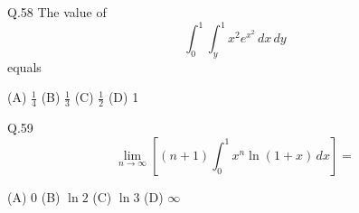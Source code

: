 \documentclass{article}
\begin{document}
																																																																																																								   \vspace{0.5cm}

																																																																																																								   Q.58 \quad  The value of 
																																																																																																								   \[
																																																																																																								   \int_0^1 \int_y^1 x^2 e^{x^2} \, dx \, dy
																																																																																																								   \]
																																																																																																								   equals

																																																																																																								   (A) $\frac{1}{4}$ \hspace{2cm} (B) $\frac{1}{3}$ \hspace{2cm} (C) $\frac{1}{2}$ \hspace{2cm} (D) 1

																																																																																																								   \vspace{0.5cm}

																																																																																																								   Q.59 \quad 
																																																																																																								   \[
																																																																																																								   \lim_{n \to \infty} \left[ (n+1) \int_0^1 x^n \ln(1+x) \, dx \right] =
																																																																																																								   \]

																																																																																																								   (A) 0 \hspace{2cm} (B) $\ln 2$ \hspace{2cm} (C) $\ln 3$ \hspace{2cm} (D) $\infty$

																																																																																																								   \vspace{0.5cm}
\end{document}
